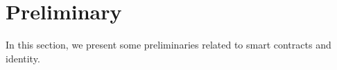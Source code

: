 
\section{Preliminary}
\label{sec:preliminary}
In this section, we present some preliminaries related to smart contracts and identity.






